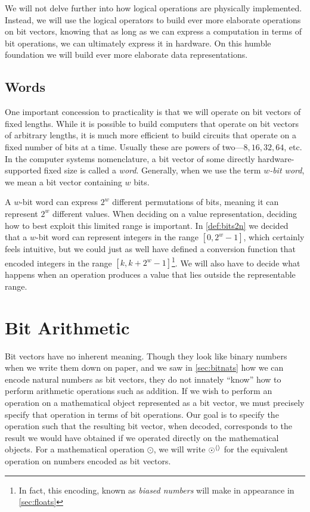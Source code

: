 We will not delve further into how logical operations are physically
implemented.  Instead, we will use the logical operators to build ever
more elaborate operations on bit vectors, knowing that as long as we
can express a computation in terms of bit operations, we can
ultimately express it in hardware.  On this humble foundation we will
build ever more elaborate data representations.

\subsection{Words}
\label{sec:words}

One important concession to practicality is that we will operate on
bit vectors of fixed lengths.  While it is possible to build computers
that operate on bit vectors of arbitrary lengths, it is much more
efficient to build circuits that operate on a fixed number of bits at
a time.  Usually these are powers of two---$8,16,32,64$, etc.  In the
computer systems nomenclature, a bit vector of some directly
hardware-supported fixed size is called a \emph{word}.  Generally,
when we use the term \emph{$w$-bit word}, we mean a bit vector
containing $w$ bits.

A $w$-bit word can express $2^{w}$ different permutations of bits,
meaning it can represent $2^{w}$ different values.  When deciding on a
value representation, deciding how to best exploit this limited range
is important.  In \cref{def:bits2n} we decided that a $w$-bit word can
represent integers in the range $[0,2^{w}-1]$, which certainly feels
intuitive, but we could just as well have defined a conversion
function that encoded integers in the range
$[k,k+2^{w}-1]$\footnote{In fact, this encoding, known as \emph{biased
    numbers} will make in appearance in \cref{sec:floats}}.  We will
also have to decide what happens when an operation produces a value
that lies outside the representable range.

\section{Bit Arithmetic}
\label{sec:bit-arithmetic}

Bit vectors have no inherent meaning.  Though they look like binary
numbers when we write them down on paper, and we saw in
\cref{sec:bitnats} how we can encode natural numbers as bit vectors,
they do not innately ``know'' how to perform arithmetic operations
such as addition.  If we wish to perform an operation on a
mathematical object represented as a bit vector, we must precisely
specify that operation in terms of bit operations.  Our goal is to
specify the operation such that the resulting bit vector, when
decoded, corresponds to the result we would have obtained if we
operated directly on the mathematical objects.  For a mathematical
operation $\odot$, we will write $\operatorname{\odot^{\langle\rangle}}$ for the equivalent
operation on numbers encoded as bit vectors.

